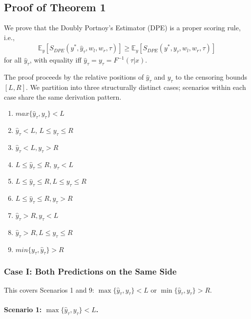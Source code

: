 \documentclass[sigconf]{acmart}
\begin{document}
\subsection{Proof of Theorem 1}



We prove that the Doubly Portnoy's Estimator (DPE) is a proper scoring rule, i.e.,
\begin{align}
\mathbb{E}_y[S_{DPE}(y^*, \hat{y}_\tau, w_l, w_r, \tau)] \ge \mathbb{E}_y[S_{DPE}(y^*, y_\tau, w_l, w_r, \tau)]
\end{align}
for all $\hat{y}_\tau$, with equality iff $\hat{y}_\tau = y_\tau = F^{-1}(\tau|x)$.

The proof proceeds by the relative positions of $\hat{y}_\tau$ and $y_\tau$ to the censoring bounds $[L, R]$. We partition into three structurally distinct cases; scenarios within each case share the same derivation pattern.
\begin{enumerate}
    \item  $max\{\hat{y}_\tau, y_\tau\} < L$
    \item  $\hat{y}_\tau < L$, $L \le y_\tau \le R$
    \item  $\hat{y}_\tau < L, y_\tau > R$
    \item  $L \le \hat{y}_\tau \le R$, $y_\tau < L$
    \item  $L \le \hat{y}_\tau \le R, L \le y_\tau \le R$
    \item  $L \le \hat{y}_\tau \le R,  y_\tau > R$
    \item  $\hat{y}_\tau > R, y_\tau < L$
    \item  $\hat{y}_\tau > R, L \le y_\tau \le R$
    \item  $min\{y_\tau, \hat{y}_\tau\} > R$
\end{enumerate}

\subsubsection{Case I: Both Predictions on the Same Side}

This covers Scenarios 1 and 9: $\max\{\hat{y}_\tau, y_\tau\} < L$ or $\min\{\hat{y}_\tau, y_\tau\} > R$.

\paragraph{Scenario 1: $\max\{\hat{y}_\tau, y_\tau\} < L$.}
\end{document}
